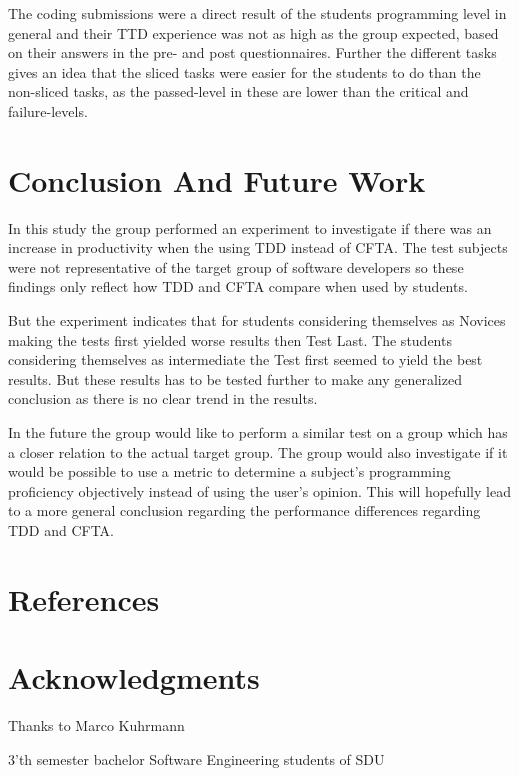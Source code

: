 \documentclass{sig-alternate-05-2015}
\begin{document}
The coding submissions were a direct result of the students programming level in general and their TTD experience was not as high as the group expected, based on their answers in the pre- and post questionnaires. Further the different tasks gives an idea that the sliced tasks were easier for the students to do than the non-sliced tasks, as the passed-level in these are lower than the critical and failure-levels.

\section{Conclusion And Future Work}
In this study the group performed an experiment to investigate if there was an increase in productivity when the using TDD instead of CFTA. The test subjects were not representative of the target group of software developers so these findings only reflect how TDD and CFTA compare when used by students. 

But the experiment indicates that for students considering themselves as Novices making the tests first yielded worse results then Test Last. The students considering themselves as intermediate the Test first seemed to yield the best results. But these results has to be tested further to make any generalized conclusion as there is no clear trend in the results.

In the future the group would like to perform a similar test on a group which has a closer relation to the actual target group. The group would also investigate if it would be possible to use a metric to determine a subject's programming proficiency objectively instead of using the user's opinion. This will hopefully lead to a more general conclusion regarding the performance differences regarding TDD and CFTA.

\section{References}



\section{Acknowledgments}

Thanks to Marco Kuhrmann

3'th semester bachelor Software Engineering students of SDU
\end{document}
